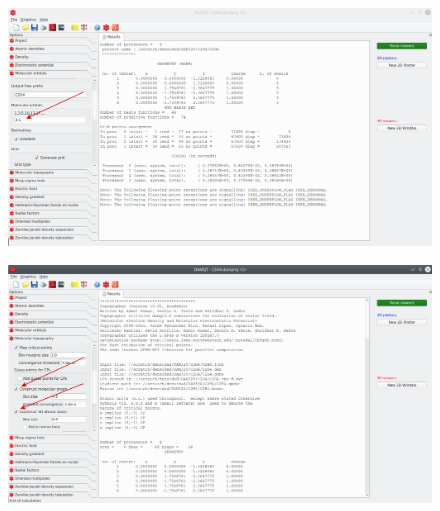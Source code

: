 \documentclass[a4paper,10pt]{article}
\begin{document}
\begin{minipage}{.5\linewidth}
\begin{figure}[H]
\caption{\label{fig:11}}
\begin{center}
\includegraphics[width=0.95\linewidth]{damqt_QS_fig11.png}
\end{center}
\end{figure} 
\end{minipage}
\begin{minipage}{.5\linewidth}
\begin{figure}[H]
\caption{\label{fig:12}}
\begin{center}
\includegraphics[width=0.95\linewidth]{damqt_QS_fig12.png}
\end{center}
\end{figure} 
\end{minipage}
\end{document}

